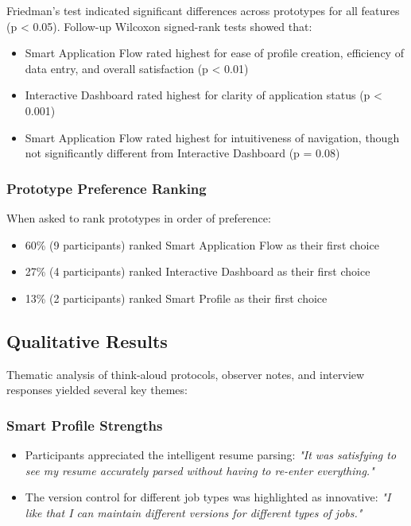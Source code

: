 \documentclass[
	letterpaper, %
]{jdf}
\begin{document}
Friedman's test indicated significant differences across prototypes for all features (p < 0.05). Follow-up Wilcoxon signed-rank tests showed that:
\begin{itemize}
    \item Smart Application Flow rated highest for ease of profile creation, efficiency of data entry, and overall satisfaction (p < 0.01)
    \item Interactive Dashboard rated highest for clarity of application status (p < 0.001)
    \item Smart Application Flow rated highest for intuitiveness of navigation, though not significantly different from Interactive Dashboard (p = 0.08)
\end{itemize}

\subsubsection{Prototype Preference Ranking}

When asked to rank prototypes in order of preference:
\begin{itemize}
    \item 60\% (9 participants) ranked Smart Application Flow as their first choice
    \item 27\% (4 participants) ranked Interactive Dashboard as their first choice
    \item 13\% (2 participants) ranked Smart Profile as their first choice
\end{itemize}

\subsection{Qualitative Results}

Thematic analysis of think-aloud protocols, observer notes, and interview responses yielded several key themes:

\subsubsection{Smart Profile Strengths}
\begin{itemize}
    \item Participants appreciated the intelligent resume parsing: \textit{"It was satisfying to see my resume accurately parsed without having to re-enter everything."}
    \item The version control for different job types was highlighted as innovative: \textit{"I like that I can maintain different versions for different types of jobs."}
\end{itemize}
\end{document}
